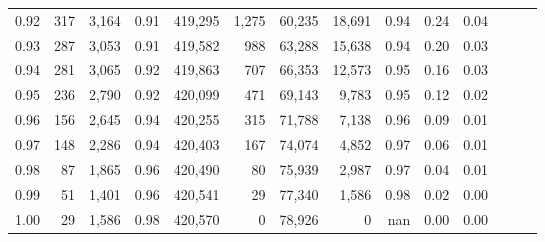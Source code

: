 \begin{tabular}{rrrrrrrrrrrrrr}
0.92 &    317 &  3,164 &  0.91 &  419,295 &    1,275 &  60,235 &  18,691 &  0.94 &  0.24 &      0.04 \\
0.93 &    287 &  3,053 &  0.91 &  419,582 &      988 &  63,288 &  15,638 &  0.94 &  0.20 &      0.03 \\
0.94 &    281 &  3,065 &  0.92 &  419,863 &      707 &  66,353 &  12,573 &  0.95 &  0.16 &      0.03 \\
0.95 &    236 &  2,790 &  0.92 &  420,099 &      471 &  69,143 &   9,783 &  0.95 &  0.12 &      0.02 \\
0.96 &    156 &  2,645 &  0.94 &  420,255 &      315 &  71,788 &   7,138 &  0.96 &  0.09 &      0.01 \\
0.97 &    148 &  2,286 &  0.94 &  420,403 &      167 &  74,074 &   4,852 &  0.97 &  0.06 &      0.01 \\
0.98 &     87 &  1,865 &  0.96 &  420,490 &       80 &  75,939 &   2,987 &  0.97 &  0.04 &      0.01 \\
0.99 &     51 &  1,401 &  0.96 &  420,541 &       29 &  77,340 &   1,586 &  0.98 &  0.02 &      0.00 \\
1.00 &     29 &  1,586 &  0.98 &  420,570 &        0 &  78,926 &       0 &   nan &  0.00 &      0.00 \\
\bottomrule
\end{tabular}
